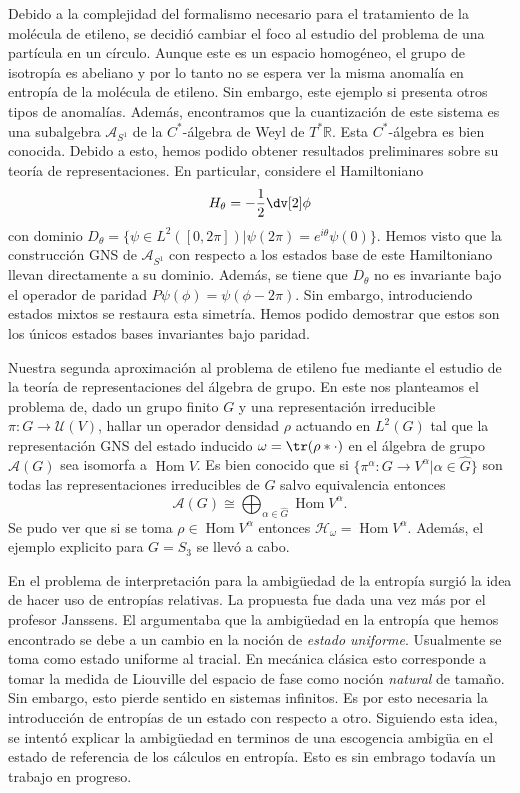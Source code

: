 \documentclass{article}
\DeclareMathOperator{\Hom}{Hom}
\begin{document}
Debido a la complejidad del formalismo necesario para el tratamiento de la molécula de etileno, se decidió cambiar el foco al estudio del problema de una partícula en un círculo. Aunque este es un espacio homogéneo, el grupo de isotropía es abeliano y por lo tanto no se espera ver la misma anomalía en entropía de la molécula de etileno. Sin embargo, este ejemplo si presenta otros tipos de anomalías\cite{Balachandran2011}. Además, encontramos que la cuantización de este sistema es una subalgebra $\mathcal{A}_{S^1}$ de la $C^*$-álgebra de Weyl de $T^*\mathbb{R}$. Esta $C^*$-álgebra es bien conocida\cite{Moretti2013}. Debido a esto, hemos podido obtener resultados preliminares sobre su teoría de representaciones. En particular, considere el Hamiltoniano 
\begin{equation}
H_\theta=-\frac{1}{2}\dv[2]\phi
\end{equation} 
con dominio $D_\theta=\{\psi\in L^2([0,2\pi])|\psi(2\pi)=e^{i\theta}\psi(0)\}$. Hemos visto que la construcción GNS de $\mathcal{A}_{S^1}$ con respecto a los estados base de este Hamiltoniano llevan directamente a su dominio. Además, se tiene que $D_\theta$ no es invariante bajo el operador de paridad $P\psi(\phi)=\psi(\phi-2\pi)$. Sin embargo, introduciendo estados mixtos se restaura esta simetría. Hemos podido demostrar que estos son los únicos estados bases invariantes bajo paridad.

Nuestra segunda aproximación al problema de etileno fue mediante el estudio de la teoría de representaciones del álgebra de grupo. En este nos planteamos el problema de, dado un grupo finito $G$ y una representación irreducible $\pi:G\rightarrow\mathcal{U}(V)$, hallar un operador densidad $\rho$ actuando en $L^2(G)$ tal que la representación GNS del estado inducido $\omega=\tr(\rho*\cdot)$ en el álgebra de grupo $\mathcal{A}(G)$ sea isomorfa a $\Hom V$. Es bien conocido que si $\{\pi^\alpha:G\rightarrow V^\alpha|\alpha\in\hat{G}\}$ son todas las representaciones irreducibles de $G$ salvo equivalencia entonces 
\begin{equation}
\mathcal{A}(G)\cong\bigoplus_{\alpha\in\hat{G}}\Hom V^\alpha.
\end{equation}
Se pudo ver que si se toma $\rho\in\Hom V^\alpha$ entonces $\mathcal{H}_\omega=\Hom V^\alpha$. Además, el ejemplo explicito para $G=S_3$ se llevó a cabo.

En el problema de interpretación para la ambigüedad de la entropía surgió la idea de hacer uso de entropías relativas. La propuesta fue dada una vez más por el profesor Janssens. El argumentaba que la ambigüedad en la entropía que hemos encontrado se debe a un cambio en la noción de \textit{estado uniforme}. Usualmente se toma como estado uniforme al tracial. En mecánica clásica esto corresponde a tomar la medida de Liouville del espacio de fase como noción \textit{natural} de tamaño. Sin embargo, esto pierde sentido en sistemas infinitos. Es por esto necesaria la introducción de entropías de un estado con respecto a otro. Siguiendo esta idea, se intentó explicar la ambigüedad en terminos de una escogencia ambigüa en el estado de referencia de los cálculos en entropía. Esto es sin embrago todavía un trabajo en progreso.  
\end{document}
